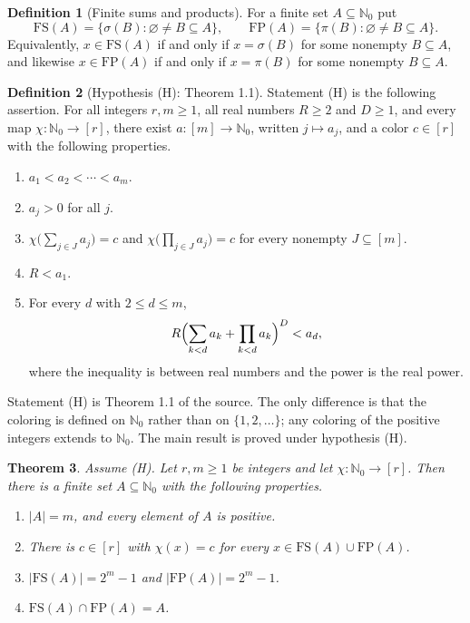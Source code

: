 \documentclass[11pt]{article}
\newtheorem{theorem}{Theorem}[section]
\theoremstyle{definition}
\newtheorem{definition}[theorem]{Definition}
\theoremstyle{remark}
\newcommand{\FS}{\mathrm{FS}}
\newcommand{\FP}{\mathrm{FP}}
\newcommand{\Nz}{\mathbb{N}_0}
\begin{document}
\begin{definition}[Finite sums and products]
For a finite set $A\subseteq\Nz$ put
\[
\FS(A)=\{\sigma(B):\varnothing\neq B\subseteq A\},\qquad
\FP(A)=\{\pi(B):\varnothing\neq B\subseteq A\}.
\]
Equivalently, $x\in\FS(A)$ if and only if $x=\sigma(B)$ for some nonempty $B\subseteq A$, and likewise $x\in\FP(A)$ if and only if $x=\pi(B)$ for some nonempty $B\subseteq A$.
\end{definition}

\begin{definition}[Hypothesis (H): Theorem 1.1]
Statement (H) is the following assertion. For all integers $r,m\ge1$, all real numbers $R\ge2$ and $D\ge1$, and every map $\chi:\Nz\to[r]$, there exist $a:[m]\to\Nz$, written $j\mapsto a_j$, and a color $c\in[r]$ with the following properties.
\begin{enumerate}
\item $a_1<a_2<\cdots<a_m$.
\item $a_j>0$ for all $j$.
\item $\chi\bigl(\sum_{j\in J}a_j\bigr)=c$ and $\chi\bigl(\prod_{j\in J}a_j\bigr)=c$ for every nonempty $J\subseteq[m]$.
\item $R<a_1$.
\item For every $d$ with $2\le d\le m$,
\[
R\Bigl(\sum_{k<d}a_k+\prod_{k<d}a_k\Bigr)^{D}<a_d,
\]
where the inequality is between real numbers and the power is the real power.
\end{enumerate}
\end{definition}

Statement (H) is Theorem 1.1 of the source. The only difference is that the coloring is defined on $\Nz$ rather than on $\{1,2,\ldots\}$; any coloring of the positive integers extends to $\Nz$. The main result is proved under hypothesis (H).

\begin{theorem}\label{thm:main}
Assume (H). Let $r,m\ge1$ be integers and let $\chi:\Nz\to[r]$. Then there is a finite set $A\subseteq\Nz$ with the following properties.
\begin{enumerate}
\item $|A|=m$, and every element of $A$ is positive.
\item There is $c\in[r]$ with $\chi(x)=c$ for every $x\in\FS(A)\cup\FP(A)$.
\item $|\FS(A)|=2^m-1$ and $|\FP(A)|=2^m-1$.
\item $\FS(A)\cap\FP(A)=A$.
\end{enumerate}
\end{theorem}
\end{document}
